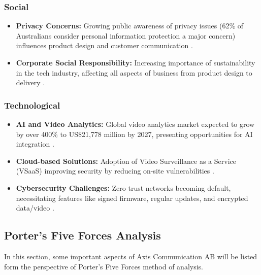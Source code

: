 \documentclass{article}
\begin{document}
\subsubsection{Social}
\begin{itemize}
    \item \textbf{Privacy Concerns:} Growing public awareness of privacy issues (62\% of Australians consider personal information protection a major concern) influences product design and customer communication \cite{iapp2023}.
    \item \textbf{Corporate Social Responsibility:} Increasing importance of sustainability in the tech industry, affecting all aspects of business from product design to delivery \cite{axis2022}.
\end{itemize}

\subsubsection{Technological}
\begin{itemize}
    \item \textbf{AI and Video Analytics:} Global video analytics market expected to grow by over 400\% to US\$21,778 million by 2027, presenting opportunities for AI integration \cite{aipix2023}.
    \item \textbf{Cloud-based Solutions:} Adoption of Video Surveillance as a Service (VSaaS) improving security by reducing on-site vulnerabilities \cite{aipix2023}.
    \item \textbf{Cybersecurity Challenges:} Zero trust networks becoming default, necessitating features like signed firmware, regular updates, and encrypted data/video \cite{axis2022}.
\end{itemize}


\subsection{Porter's Five Forces Analysis}
In this section, some important aspects of Axis Communication AB will be listed form the perspective of Porter's Five Forces method of analysis.
\end{document}
